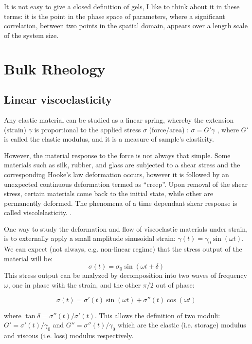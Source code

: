 It is not easy to give a closed definition of
gels\citep{gennes_scaling_1979,rubinstein_polymer_2003}, I like to think about
it in these terms: it is the point in the phase space of parameters, where a significant correlation, between two points in the
spatial domain, appears over a length scale of the system size.

\section{Bulk Rheology}
\subsection{Linear viscoelasticity}
Any elastic material can be studied as a linear spring, whereby the
extension (strain) $\gamma$ is proportional to the applied stress $\sigma$ (force/area) :
$\sigma=G'\gamma$ , where $G'$ is called the elastic modulus, and it is a
measure of sample's elasticity.

However, the material response to the force is not always that simple. Some
materials such as silk, rubber, and glass are subjected to a shear
stress and the corresponding Hooke's law deformation occurs, however it is
followed by an unexpected continuous deformation termed as ``creep''. Upon
removal of the shear stress, certain materials come back to the initial state,
while other are permanently deformed. The phenomena of a time dependant shear
response is called viscolelasticity. \citep{macosko_rheology:_1994}.

One way to study the deformation and flow of viscoelastic materials under
strain, is to externally apply a small amplitude
sinusoidal strain:
$\gamma(t)=\gamma_0\sin(\omega t)$. We can expect (not always, e.g. non-linear
regime) that the stress output of the material will be:
\begin{equation}\label{viscoelastic-response}
\sigma(t) = \sigma_0 \sin(\omega t + \delta)
\end{equation}
This stress output can be
analyzed by decomposition into two waves of frequency $\omega$, one in phase
with the strain, and the other $\pi/2$ out of phase:

\begin{equation}\label{viscoelastic-stress}
\sigma(t) = \sigma'(t) \sin(\omega t) + \sigma''(t)\cos(\omega t)
\end{equation}

where $ \tan \delta=\sigma''(t)/\sigma'(t)$. This allows the definition of two
moduli: $G'=\sigma'(t)/\gamma_0$ and $G''=\sigma''(t)/\gamma_0$ which are the
elastic (i.e. storage) modulus and viscous (i.e. loss) modulus respectively.

